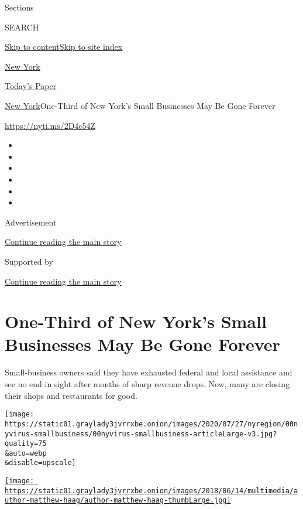 Sections

SEARCH

\protect\hyperlink{site-content}{Skip to
content}\protect\hyperlink{site-index}{Skip to site index}

\href{https://www.nytimes3xbfgragh.onion/section/nyregion}{New York}

\href{https://myaccount.nytimes3xbfgragh.onion/auth/login?response_type=cookie\&client_id=vi}{}

\href{https://www.nytimes3xbfgragh.onion/section/todayspaper}{Today's
Paper}

\href{/section/nyregion}{New York}\textbar{}One-Third of New York's
Small Businesses May Be Gone Forever

\href{https://nyti.ms/2D4c54Z}{https://nyti.ms/2D4c54Z}

\begin{itemize}
\item
\item
\item
\item
\item
\item
\end{itemize}

Advertisement

\protect\hyperlink{after-top}{Continue reading the main story}

Supported by

\protect\hyperlink{after-sponsor}{Continue reading the main story}

\hypertarget{one-third-of-new-yorks-small-businesses-may-be-gone-forever}{%
\section{One-Third of New York's Small Businesses May Be Gone
Forever}\label{one-third-of-new-yorks-small-businesses-may-be-gone-forever}}

Small-business owners said they have exhausted federal and local
assistance and see no end in sight after months of sharp revenue drops.
Now, many are closing their shops and restaurants for good.

\texttt{[image: https://static01.graylady3jvrrxbe.onion/images/2020/07/27/nyregion/00nyvirus-smallbusiness/00nyvirus-smallbusiness-articleLarge-v3.jpg?quality=75\\\&auto=webp\\\&disable=upscale]}

\href{https://www.nytimes3xbfgragh.onion/by/matthew-haag}{\texttt{[image: https://static01.graylady3jvrrxbe.onion/images/2018/06/14/multimedia/author-matthew-haag/author-matthew-haag-thumbLarge.jpg]}}

